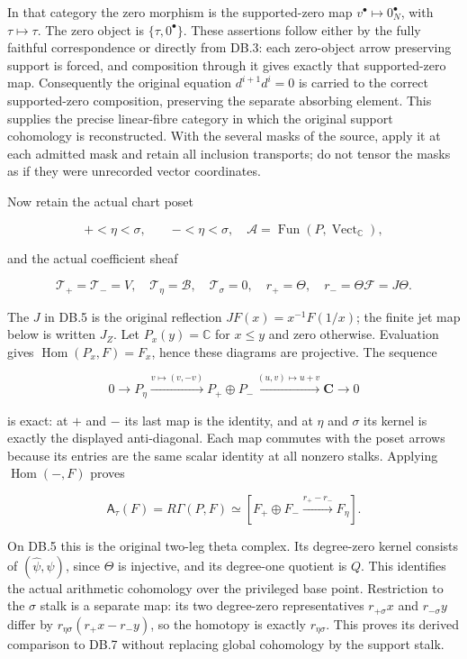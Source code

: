 In that category the zero morphism is the supported-zero map \(v^\bullet\mapsto0_N^\bullet\), with \(\tau\mapsto\tau\). The zero object is \(\{\tau,0^\bullet\}\). These assertions follow either by the fully faithful correspondence or directly from DB.3: each zero-object arrow preserving support is forced, and composition through it gives exactly that supported-zero map. Consequently the original equation \(d^{i+1}d^i=0\) is carried to the correct supported-zero composition, preserving the separate absorbing element. This supplies the precise linear-fibre category in which the original support cohomology is reconstructed. With the several masks of the source, apply it at each admitted mask and retain all inclusion transports; do not tensor the masks as if they were unrecorded vector coordinates.

Now retain the actual chart poset

\[
+<\eta<\sigma,\qquad -<\eta<\sigma,
\quad\mathcal A=\operatorname{Fun}(P,\operatorname{Vect}_{\mathbb C}),
\tag{DB.4}
\]

and the actual coefficient sheaf

\[
\mathcal T_+=\mathcal T_-=V,\quad
\mathcal T_\eta=\mathscr B,\quad\mathcal T_\sigma=0,
\quad r_+=\Theta,\quad r_-=\Theta\mathcal F=J\Theta.
\tag{DB.5}
\]

The \(J\) in DB.5 is the original reflection \(JF(x)=x^{-1}F(1/x)\); the finite jet map below is written \(J_Z\). Let \(P_x(y)=\mathbb C\) for \(x\le y\) and zero otherwise. Evaluation gives \(\operatorname{Hom}(P_x,F)=F_x\), hence these diagrams are projective. The sequence

\[
0\to P_\eta\xrightarrow{v\mapsto(v,-v)}P_+\oplus P_-
 \xrightarrow{(u,v)\mapsto u+v}\mathbf C\to0
\tag{DB.6}
\]

is exact: at \(+\) and \(-\) its last map is the identity, and at \(\eta\) and \(\sigma\) its kernel is exactly the displayed anti-diagonal. Each map commutes with the poset arrows because its entries are the same scalar identity at all nonzero stalks. Applying \(\operatorname{Hom}(-,F)\) proves

\[
\mathsf A_\tau(F)=R\Gamma(P,F)
\simeq[F_+\oplus F_-\xrightarrow{r_+-r_-}F_\eta].
\tag{DB.7}
\]

On DB.5 this is the original two-leg theta complex. Its degree-zero kernel consists of \((\widehat\psi,\psi)\), since \(\Theta\) is injective, and its degree-one quotient is \(Q\). This identifies the actual arithmetic cohomology over the privileged base point. Restriction to the \(\sigma\) stalk is a separate map: its two degree-zero representatives \(r_{+\sigma}x\) and \(r_{-\sigma}y\) differ by \(r_{\eta\sigma}(r_+x-r_-y)\), so the homotopy is exactly \(r_{\eta\sigma}\). This proves its derived comparison to DB.7 without replacing global cohomology by the support stalk.

